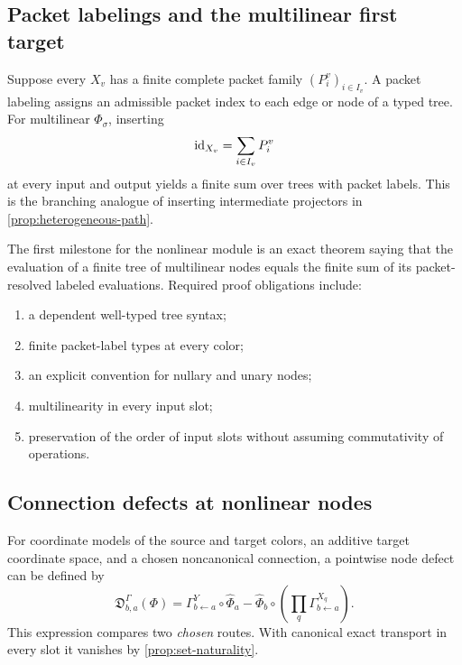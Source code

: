 \subsection{Packet labelings and the multilinear first target}

Suppose every $X_v$ has a finite complete packet family
$(P^v_i)_{i\in I_v}$.  A packet labeling assigns an admissible packet index
to each edge or node of a typed tree.  For multilinear $\Phi_\sigma$, inserting
\[
\operatorname{id}_{X_v}=\sum_{i\in I_v}P^v_i
\]
at every input and output yields a finite sum over trees with packet labels.
This is the branching analogue of inserting intermediate projectors in
\cref{prop:heterogeneous-path}.

\begin{roadmap}
\label{roadmap:multilinear-tree}
The first milestone for the nonlinear module is an exact theorem saying that the
evaluation of a finite tree of multilinear nodes equals the finite sum of its
packet-resolved labeled evaluations.  Required proof obligations include:
\begin{enumerate}[label=(\alph*)]
\item a dependent well-typed tree syntax;
\item finite packet-label types at every color;
\item an explicit convention for nullary and unary nodes;
\item multilinearity in every input slot;
\item preservation of the order of input slots without assuming commutativity of
operations.
\end{enumerate}
\end{roadmap}

\subsection{Connection defects at nonlinear nodes}

For coordinate models of the source and target colors, an additive target
coordinate space, and a chosen noncanonical connection, a pointwise node
defect can be defined by
\[
\mathfrak D^\Gamma_{b,a}(\Phi)
=
\Gamma^Y_{b\leftarrow a}\circ\widehat\Phi_a
-
\widehat\Phi_b\circ
\left(\prod_q\Gamma^{X_q}_{b\leftarrow a}\right).
\]
This expression compares two \emph{chosen} routes.  With canonical exact
transport in every slot it vanishes by \cref{prop:set-naturality}.

